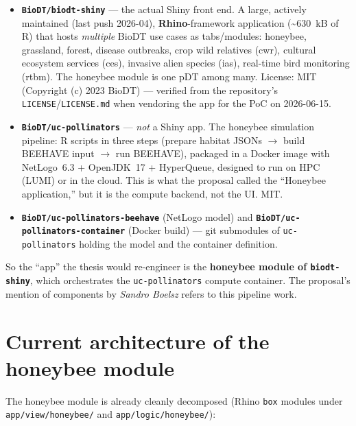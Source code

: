 \documentclass[12pt,a4paper]{article}
\begin{document}
\begin{itemize}[nosep]
  \item \textbf{\texttt{BioDT/biodt-shiny}} --- the actual Shiny front end. A
    large, actively maintained (last push 2026-04), \textbf{Rhino}-framework
    application (\textasciitilde 630~kB of R) that hosts \emph{multiple} BioDT
    use cases as tabs/modules: honeybee, grassland, forest, disease outbreaks,
    crop wild relatives (cwr), cultural ecosystem services (ces), invasive alien
    species (ias), real-time bird monitoring (rtbm). The honeybee module is one
    pDT among many. License: MIT (Copyright (c) 2023 BioDT) --- verified from the
    repository's \texttt{LICENSE}/\texttt{LICENSE.md} when vendoring the app for
    the PoC on 2026-06-15.
  \item \textbf{\texttt{BioDT/uc-pollinators}} --- \emph{not} a Shiny app. The
    honeybee simulation pipeline: R scripts in three steps (prepare habitat
    JSONs $\rightarrow$ build BEEHAVE input $\rightarrow$ run BEEHAVE), packaged
    in a Docker image with NetLogo~6.3 + OpenJDK~17 + HyperQueue, designed to run
    on HPC (LUMI) or in the cloud. This is what the proposal called the
    ``Honeybee application,'' but it is the compute backend, not the UI. MIT.
  \item \textbf{\texttt{BioDT/uc-pollinators-beehave}} (NetLogo model) and
    \textbf{\texttt{BioDT/uc-pollinators-container}} (Docker build) --- git
    submodules of \texttt{uc-pollinators} holding the model and the container
    definition.
\end{itemize}

So the ``app'' the thesis would re-engineer is the \textbf{honeybee module of
\texttt{biodt-shiny}}, which orchestrates the \texttt{uc-pollinators} compute
container. The proposal's mention of components by \emph{Sandro Boelsz} refers to
this pipeline work.

\section{Current architecture of the honeybee module}

The honeybee module is already cleanly decomposed (Rhino \texttt{box} modules
under \texttt{app/view/honeybee/} and \texttt{app/logic/honeybee/}):
\end{document}
